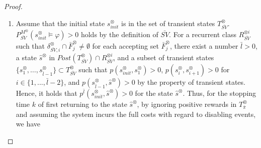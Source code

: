 \documentclass[10pt]{article}
\newtheorem{proof}{Proof}
\begin{document}
\begin{proof}
\begin{enumerate}
  \item Assume that the initial state $s^{\otimes}_{init}$ is in the set of transient states $T_{\bar{SV}}^{\otimes}$.$P^{M^{\otimes}}_{\bar{SV}}(s^{\otimes}_{init} \models \varphi) > 0$ holds by the definition of $\bar{SV}$. For a recurrent class $R^{\otimes i}_{\bar{SV}}$ such that $\delta^{\otimes}_{\bar{SV}, i} \cap \bar{F}^{\otimes}_j \neq \emptyset$ for each accepting set
    $\bar{F}^{\otimes}_j$, there exist a number $\bar{l} > 0$, a state $\hat{s}^{\otimes}$ in $Post(T^{\otimes}_{\bar{SV}}) \cap R^{\otimes i}_{\bar{SV}}$, and a subset of transient states $\{ s^{\otimes}_1, \ldots , s^{\otimes}_{\bar{l}-1} \} \subset T^{\otimes}_{\bar{SV}}$ such that $p(s^{\otimes}_{init}, s^{\otimes}_1)>0$, $p(s^{\otimes}_{i}, s^{\otimes}_{i+1})>0$ for $i \in \{ 1,...,\bar{l}-2 \}$, and $p(s^{\otimes}_{\bar{l}-1}, \hat{s}^{\otimes})>0$ by the property of transient states.
    Hence, it holds that $p^{\bar{l}}(s^{\otimes}_{init}, \hat{s}^{\otimes}) > 0$ for the state $\hat{s}^{\otimes}$. Thus, for the stopping time $k$ of first returning to the state $\hat{s}^{\otimes}$, by ignoring positive rewards in $T^{\otimes}_{\bar{\pi}}$ and assuming the system incurs the full costs with regard to disabling events, we have



\end{enumerate}
\end{proof}
\end{document}
